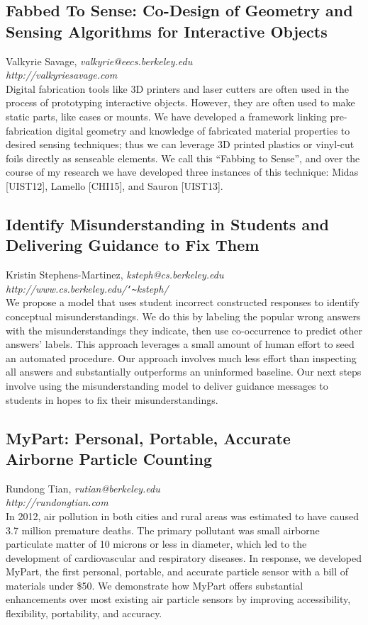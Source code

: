 \documentclass[foldmark,10pt,a4paper,notumble]{leaflet}
\newcommand{\name}[1]{#1,}
\newcommand{\email}[1]{\emph{#1}}
\newcommand{\website}[1]{\\\emph{#1}\\[3pt]}
\begin{document}
\subsection{Fabbed To Sense: Co-Design of Geometry and Sensing Algorithms for Interactive Objects}
\name{Valkyrie Savage}
\email{valkyrie@eecs.berkeley.edu}
\website{http://valkyriesavage.com}
Digital fabrication tools like 3D printers and laser cutters are often used in the process of prototyping interactive objects. However, they are often used to make static parts, like cases or mounts. We have developed a framework linking pre-fabrication digital geometry and knowledge of fabricated material properties to desired sensing techniques; thus we can leverage 3D printed plastics or vinyl-cut foils directly as senseable elements. We call this ``Fabbing to Sense'', and over the course of my research we have developed three instances of this technique: Midas [UIST12], Lamello [CHI15], and Sauron [UIST13].

\subsection{Identify Misunderstanding in Students and Delivering Guidance to Fix Them}
\name{Kristin Stephens-Martinez}
\email{ksteph@cs.berkeley.edu}
\website{http://www.cs.berkeley.edu/\texttt{\char`\~}ksteph/}
We propose a model that uses student incorrect constructed responses to identify conceptual misunderstandings. We do this by labeling the popular wrong answers with the misunderstandings they indicate, then use co-occurrence to predict other answers' labels. This approach leverages a small amount of human effort to seed an automated procedure. Our approach involves much less effort than inspecting all answers and substantially outperforms an uninformed baseline. Our next steps involve using the misunderstanding model to deliver guidance messages to students in hopes to fix their misunderstandings.

\subsection{MyPart: Personal, Portable, Accurate Airborne Particle Counting}
\name{Rundong Tian}
\email{rutian@berkeley.edu}
\website{http://rundongtian.com}
In 2012, air pollution in both cities and rural areas was estimated to have caused 3.7 million premature deaths. The primary pollutant was small airborne particulate matter of 10 microns or less in diameter, which led to the development of cardiovascular and respiratory diseases. In response, we developed MyPart, the first personal, portable, and accurate particle sensor with a bill of materials under \$50. We demonstrate how MyPart offers substantial enhancements over most existing air particle sensors by improving accessibility, flexibility, portability, and accuracy.
\end{document}
